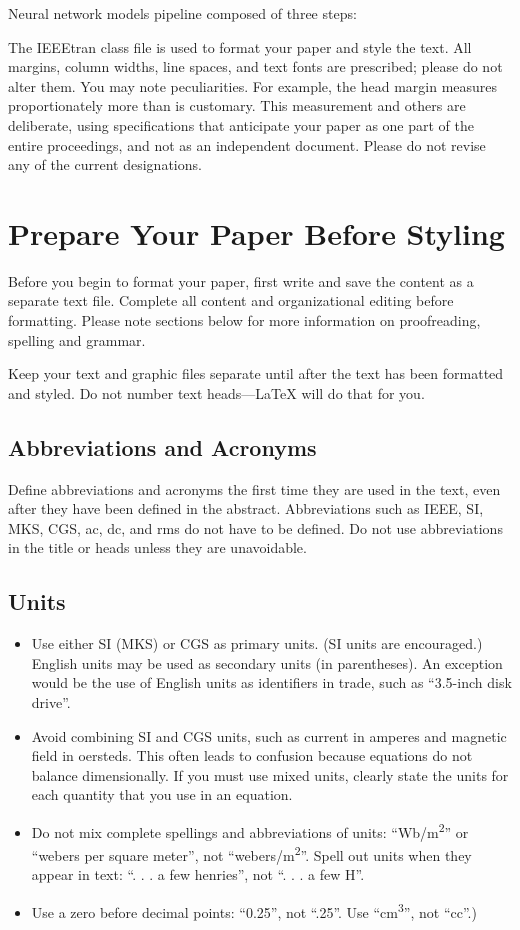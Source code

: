 \documentclass[conference]{IEEEtran}
\begin{document}
Neural network models pipeline composed of three steps:





The IEEEtran class file is used to format your paper and style the text. All margins, 
column widths, line spaces, and text fonts are prescribed; please do not 
alter them. You may note peculiarities. For example, the head margin
measures proportionately more than is customary. This measurement 
and others are deliberate, using specifications that anticipate your paper 
as one part of the entire proceedings, and not as an independent document. 
Please do not revise any of the current designations.

\section{Prepare Your Paper Before Styling}
Before you begin to format your paper, first write and save the content as a 
separate text file. Complete all content and organizational editing before 
formatting. Please note sections  below for more information on 
proofreading, spelling and grammar.

Keep your text and graphic files separate until after the text has been 
formatted and styled. Do not number text heads---{\LaTeX} will do that 
for you.

\subsection{Abbreviations and Acronyms}\label{AA}
Define abbreviations and acronyms the first time they are used in the text, 
even after they have been defined in the abstract. Abbreviations such as 
IEEE, SI, MKS, CGS, ac, dc, and rms do not have to be defined. Do not use 
abbreviations in the title or heads unless they are unavoidable.

\subsection{Units}
\begin{itemize}
\item Use either SI (MKS) or CGS as primary units. (SI units are encouraged.) English units may be used as secondary units (in parentheses). An exception would be the use of English units as identifiers in trade, such as ``3.5-inch disk drive''.
\item Avoid combining SI and CGS units, such as current in amperes and magnetic field in oersteds. This often leads to confusion because equations do not balance dimensionally. If you must use mixed units, clearly state the units for each quantity that you use in an equation.
\item Do not mix complete spellings and abbreviations of units: ``Wb/m\textsuperscript{2}'' or ``webers per square meter'', not ``webers/m\textsuperscript{2}''. Spell out units when they appear in text: ``. . . a few henries'', not ``. . . a few H''.
\item Use a zero before decimal points: ``0.25'', not ``.25''. Use ``cm\textsuperscript{3}'', not ``cc''.)
\end{itemize}
\end{document}
